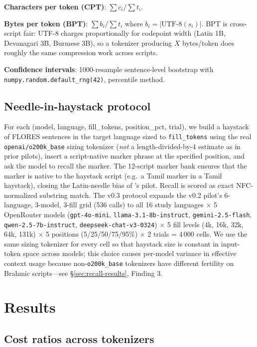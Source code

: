 \documentclass[11pt,a4paper]{article}
\begin{document}
\textbf{Characters per token (CPT)}: $\sum c_i / \sum t_i$.

\textbf{Bytes per token (BPT)}: $\sum b_i / \sum t_i$ where $b_i = |\text{UTF-8}(s_i)|$. BPT is cross-script fair: UTF-8 charges proportionally for codepoint width (Latin 1B, Devanagari 3B, Burmese 3B), so a tokenizer producing $X$ bytes/token does roughly the same compression work across scripts.

\textbf{Confidence intervals}: 1000-resample sentence-level bootstrap with \texttt{numpy.random.default\_rng(42)}, percentile method.

\subsection{Needle-in-haystack protocol}
\label{sec:niah}

For each (model, language, fill\_tokens, position\_pct, trial), we build a haystack of FLORES sentences in the target language sized to \texttt{fill\_tokens} using the real \texttt{openai/o200k\_base} sizing tokenizer (\emph{not} a length-divided-by-4 estimate as in prior pilots), insert a script-native marker phrase at the specified position, and ask the model to recall the marker. The 12-script marker bank ensures that the marker is native to the haystack script (e.g.\ a Tamil marker in a Tamil haystack), closing the Latin-needle bias of \citet{ng2025sealion}'s pilot. Recall is scored as exact NFC-normalized substring match. The v0.3 protocol expands the v0.2 pilot's 6-language, 3-model, 3-fill grid (536 calls) to all 16 study languages $\times$ 5 OpenRouter models (\texttt{gpt-4o-mini}, \texttt{llama-3.1-8b-instruct}, \texttt{gemini-2.5-flash}, \texttt{qwen-2.5-7b-instruct}, \texttt{deepseek-chat-v3-0324}) $\times$ 5 fill levels (4k, 16k, 32k, 64k, 131k) $\times$ 5 positions (5/25/50/75/95\%) $\times$ 2 trials = 4\,000 cells. We use the same sizing tokenizer for every cell so that haystack size is constant in input-token space across models; this choice causes per-model variance in effective context usage because non-\texttt{o200k\_base} tokenizers have different fertility on Brahmic scripts---see \S\ref{sec:recall-results}, Finding 3.

\section{Results}
\label{sec:results}

\subsection{Cost ratios across tokenizers}
\end{document}
